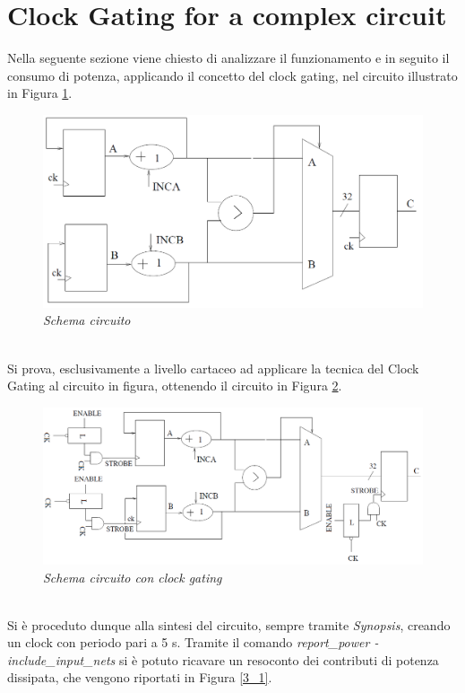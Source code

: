 \section{Clock Gating for a complex circuit}
Nella seguente sezione viene chiesto di analizzare il funzionamento e in seguito il consumo di potenza, applicando il concetto del clock gating, nel circuito illustrato in Figura \ref{circuito_3_2}.\\
\begin{figure}[!htb]
	\centering
	\includegraphics[scale=0.8]{immagini/circuito_3_2}
	\caption{\textit{Schema circuito}}
	\label{circuito_3_2}
\end{figure}
\\
Si prova, esclusivamente a livello cartaceo ad applicare la tecnica del Clock Gating al circuito in figura, ottenendo il circuito in Figura \ref{clkgating}.\\
\begin{figure}[!htb]
	\centering
	\includegraphics[scale=0.3]{immagini/clkgating}
	\caption{\textit{Schema circuito con clock gating}}
	\label{clkgating}
\end{figure}
\\
Si è proceduto dunque alla sintesi del circuito, sempre tramite \textit{Synopsis}, creando un clock con periodo pari a 5 s. Tramite il comando \textit{report\_power -include\_input\_nets} si è potuto ricavare un resoconto dei contributi di potenza dissipata, che vengono riportati in Figura \ref{3_1}. \\
